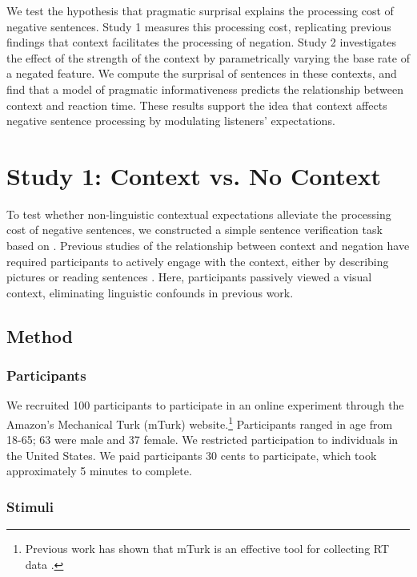 \documentclass[10pt,letterpaper]{article}
\begin{document}
We test the hypothesis that pragmatic surprisal explains the processing cost of negative sentences. Study 1 measures this processing cost, replicating previous findings that context facilitates the processing of negation.  Study 2 investigates the effect of the strength of the context by parametrically varying the base rate of a negated feature.  We compute the surprisal of sentences in these contexts, and find that a model of pragmatic informativeness predicts the relationship between context and reaction time.  These results support the idea that context affects negative sentence processing by modulating listeners' expectations. 

\section{Study 1: Context vs. No Context}

To test whether non-linguistic contextual expectations alleviate the processing cost of negative sentences, we constructed a simple sentence verification task based on .  Previous studies of the relationship between context and negation have required participants to actively engage with the context, either by describing pictures \cite{wason1965} or reading sentences \cite{glenberg1999}.  Here, participants passively viewed a visual context, eliminating linguistic confounds in previous work.  

\subsection{Method}

\subsubsection{Participants}

We recruited 100 participants to participate in an online experiment through the Amazon's Mechanical Turk (mTurk) website.\footnote{Previous work has shown that mTurk is an effective tool for collecting RT data \cite{crump2013}.}  Participants ranged in age from 18-65; 63 were male and 37 female.  We restricted participation to individuals in the United States. We paid participants 30 cents to participate, which took approximately 5 minutes to complete.  

\subsubsection{Stimuli}
\end{document}
